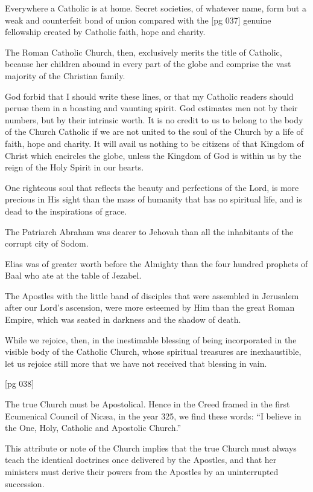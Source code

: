 Everywhere a Catholic is at home. Secret societies,
of whatever name, form but a weak and
counterfeit bond of union compared with the
[pg 037]
genuine fellowship created by Catholic faith, hope
and charity.

The Roman Catholic Church, then, exclusively
merits the title of Catholic, because her children
abound in every part of the globe and comprise
the vast majority of the Christian family.

God forbid that I should write these lines, or
that my Catholic readers should peruse them in a
boasting and vaunting spirit. God estimates men
not by their numbers, but by their intrinsic worth.
It is no credit to us to belong to the body of the
Church Catholic if we are not united to the soul of
the Church by a life of faith, hope and charity. It
will avail us nothing to be citizens of that Kingdom
of Christ which encircles the globe, unless the
Kingdom of God is within us by the reign of the
Holy Spirit in our hearts.

One righteous soul that reflects the beauty and
perfections of the Lord, is more precious in His
sight than the mass of humanity that has no spiritual
life, and is dead to the inspirations of grace.

The Patriarch Abraham was dearer to Jehovah
than all the inhabitants of the corrupt city of
Sodom.

Elias was of greater worth before the Almighty
than the four hundred prophets of Baal who ate at
the table of Jezabel.

The Apostles with the little band of disciples
that were assembled in Jerusalem after our Lord's
ascension, were more esteemed by Him than the
great Roman Empire, which was seated in darkness
and the shadow of death.

While we rejoice, then, in the inestimable blessing
of being incorporated in the visible body of
the Catholic Church, whose spiritual treasures are
inexhaustible, let us rejoice still more that we have
not received that blessing in vain.

[pg 038]


The true Church must be Apostolical. Hence
in the Creed framed in the first Ecumenical
Council of Nicæa, in the year 325, we find
these words: “I believe in the One, Holy, Catholic
and Apostolic Church.”

This attribute or note of the Church implies
that the true Church must always teach the identical
doctrines once delivered by the Apostles, and
that her ministers must derive their powers from
the Apostles by an uninterrupted succession.

